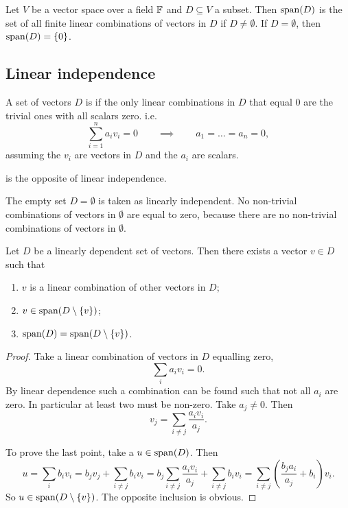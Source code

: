 \begin{proposition}
Let $V$ be a vector space over a field $\mathbb{F}$ and $D\subseteq V$ a subset. Then $\operatorname{span}(D)$ is the set of all finite linear combinations of vectors in $D$ if $D \neq \emptyset$. If $D = \emptyset$, then $\operatorname{span}(D) = \{0\}$.
\end{proposition}

\subsection{Linear independence}
\begin{definition}
A set of vectors $D$ is  if the only linear combinations in $D$ that equal $0$ are the trivial ones with all scalars zero. i.e.\,
\[ \sum_{i=1}^n a_iv_i = 0 \qquad\implies\qquad a_1=\ldots=a_n = 0 , \]
assuming the $v_i$ are vectors in $D$ and the $a_i$ are scalars.

 is the opposite of linear independence.
\end{definition}
The empty set $D=\emptyset$ is taken as linearly independent. No non-trivial combinations of vectors in $\emptyset$ are equal to zero, because there are no non-trivial combinations of vectors in $\emptyset$.

\begin{lemma}
Let $D$ be a linearly dependent set of vectors. Then there exists a vector $v\in D$ such that
\begin{enumerate}
\item $v$ is a linear combination of other vectors in $D$;
\item $v\in \operatorname{span}(D\setminus\{v\})$;
\item $\operatorname{span}(D) = \operatorname{span}(D\setminus\{v\})$.
\end{enumerate}
\label{linearDependence}
\end{lemma}
\begin{proof}
Take a linear combination of vectors in $D$ equalling zero,
\[ \sum_i a_iv_i = 0. \]
By linear dependence such a combination can be found such that not all $a_i$ are zero. In particular at least two must be non-zero. Take $a_j\neq 0$. Then
\[ v_j = \sum_{i\neq j}\frac{a_iv_i}{a_j}. \]

To prove the last point, take a $u\in \operatorname{span}(D)$. Then
\[ u = \sum_i b_iv_i = b_j v_j + \sum_{i\neq j} b_iv_i = b_j\sum_{i\neq j}\frac{a_iv_i}{a_j} + \sum_{i\neq j} b_iv_i = \sum_{i\neq j}\left(\frac{b_ja_i}{a_j}+b_i\right)v_i.  \]
So $u\in \operatorname{span}(D\setminus\{v\})$. The opposite inclusion is obvious. 
\end{proof}

